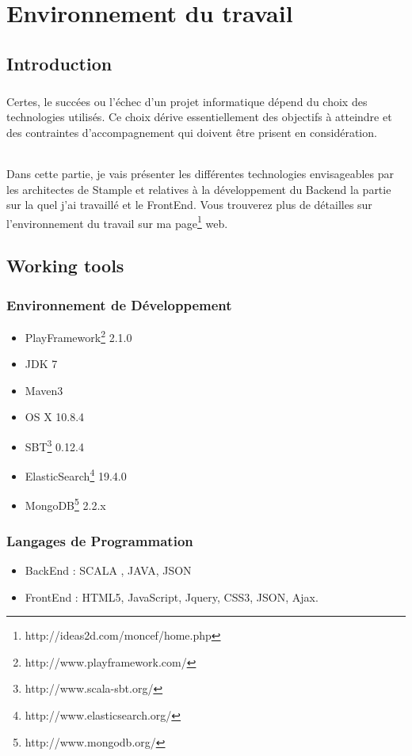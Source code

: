 \chapter{Environnement du travail}
\section{Introduction}
\paragraph{}
Certes, le succées ou l'échec d'un projet informatique dépend du choix des technologies utilisés.
Ce choix dérive essentiellement des objectifs à atteindre et des contraintes d'accompagnement qui doivent être prisent en considération.
\subparagraph{}
Dans cette partie, je vais présenter les différentes technologies envisageables par les architectes de Stample 
et relatives à la développement du Backend la partie sur la quel j'ai travaillé et le FrontEnd.
Vous trouverez plus de détailles sur l'environnement du travail sur ma page\footnote{http://ideas2d.com/moncef/home.php} web.
\section{Working tools}
\subsection{Environnement de Développement}
\begin{itemize}
\item PlayFramework\footnote{http://www.playframework.com/} 2.1.0
\item JDK 7
\item Maven3
\item OS X 10.8.4
\item SBT\footnote{http://www.scala-sbt.org/} 0.12.4
\item ElasticSearch\footnote{http://www.elasticsearch.org/} 19.4.0
\item MongoDB\footnote{http://www.mongodb.org/} 2.2.x
\end{itemize}
\subsection{Langages de Programmation}
\begin{itemize}
\item BackEnd : SCALA , JAVA, JSON
\item FrontEnd : HTML5, JavaScript, Jquery, CSS3, JSON, Ajax. 
\end{itemize}
